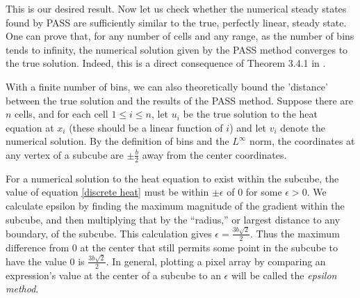 \documentclass[11pt]{article}
\begin{document}
This is our desired result. Now let us check whether the numerical steady states found by PASS are sufficiently similar to the true, perfectly linear, steady state. One can prove that, for any number of cells and any range, as the number of bins tends to infinity, the numerical solution given by the PASS method converges to the true solution. Indeed, this is a direct consequence of Theorem 3.4.1 in \citep{Introduction_to_PA}.
%
%
%
%

With a finite number of bins, we can also theoretically bound the 'distance' between the true solution and the results of the PASS method. Suppose there are $n$ cells, and for each cell $1\leq i\leq n$, let $u_i$ be the true solution to the heat equation at $x_i$ (these should be a linear function of $i$) and let $v_i$ denote the numerical solution. By the definition of bins and the $L^\infty$ norm, the coordinates at any vertex of a subcube are $\pm \frac{b}{2}$ away from the center coordinates. 

For a numerical solution to the heat equation to exist within the subcube, the value of equation \cref{discrete heat} must be within $\pm \epsilon$ of 0 for some $\epsilon > 0$. We calculate epsilon by finding the maximum magnitude of the gradient within the subcube, and then multiplying that by the ``radius,'' or largest distance to any boundary, of the subcube. This calculation gives $\epsilon = \frac{3b\sqrt{2}}{2}$. Thus the maximum difference from 0 at the center that still permits some point in the subcube to have the value 0 is $\frac{3b\sqrt{2}}{2}$. In general, plotting a pixel array by comparing an expression's value at the center of a subcube to an $\epsilon$ will be called the \emph{epsilon method}.
\end{document}
